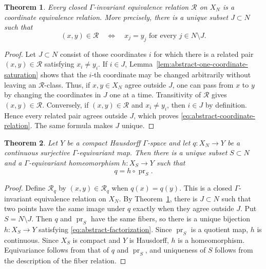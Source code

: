 \documentclass[11pt]{amsart}
\numberwithin{equation}{section}
\newtheorem{theorem}{Theorem}[section]
\theoremstyle{definition}
\begin{document}
	\begin{theorem}
		\label{thm:abstract-coordinate-equivalence}
		Every closed $\Gamma$-invariant equivalence relation $\mathcal R$ on $X_N$ is a
		coordinate equivalence relation.  More precisely, there is a unique subset
		$J\subset N$ such that
		\begin{equation}
			\label{eq:abstract-coordinate-relation}
			(x,y)\in\mathcal R
			\quad\Longleftrightarrow\quad
			x_j=y_j\text{ for every }j\in N\setminus J.
		\end{equation}
	\end{theorem}
	
	\begin{proof}
		Let $J\subset N$ consist of those coordinates $i$ for which there is a related
		pair $(x,y)\in\mathcal R$ satisfying $x_i\neq y_i$.
		If $i\in J$, Lemma~\ref{lem:abstract-one-coordinate-saturation} shows that the
		$i$-th coordinate may be changed arbitrarily without leaving an $\mathcal R$-class.
		Thus, if $x,y\in X_N$ agree outside $J$, one can pass from $x$ to $y$ by
		changing the coordinates in $J$ one at a time. Transitivity of $\mathcal R$ gives
		$(x,y)\in\mathcal R$. Conversely, if $(x,y)\in\mathcal R$ and $x_i\neq y_i$, then
		$i\in J$ by definition.  Hence every related pair agrees outside $J$, which
		proves \eqref{eq:abstract-coordinate-relation}.  The same formula makes $J$
		unique.
	\end{proof}
	
	\begin{theorem}
		\label{thm:abstract-topological-factor}
		Let $Y$ be a compact Hausdorff $\Gamma$-space and let
		$q:X_N\to Y$ be a continuous surjective $\Gamma$-equivariant map.  Then there
		is a unique subset $S\subset N$ and a $\Gamma$-equivariant homeomorphism
		$h:X_S\to Y$ such that
		\begin{equation}
			\label{eq:abstract-factorization}
			q=h\circ\operatorname{pr}_S.
		\end{equation}
	\end{theorem}
	
	\begin{proof}
		Define $\mathcal R_q$ by $(x,y)\in\mathcal R_q$ when $q(x)=q(y)$. This is a closed
		$\Gamma$-invariant equivalence relation on $X_N$. By
		Theorem~\ref{thm:abstract-coordinate-equivalence}, there is $J\subset N$ such
		that two points have the same image under $q$ exactly when they agree outside
		$J$.  Put $S=N\setminus J$.  Then $q$ and $\operatorname{pr}_S$ have the same
		fibers, so there is a unique bijection $h:X_S\to Y$ satisfying
		\eqref{eq:abstract-factorization}.  Since $\operatorname{pr}_S$ is a quotient
		map, $h$ is continuous.  Since $X_S$ is compact and $Y$ is Hausdorff, $h$ is a
		homeomorphism.  Equivariance follows from that of $q$ and
		$\operatorname{pr}_S$, and uniqueness of $S$ follows from the description of
		the fiber relation.
	\end{proof}
	
\end{document}
